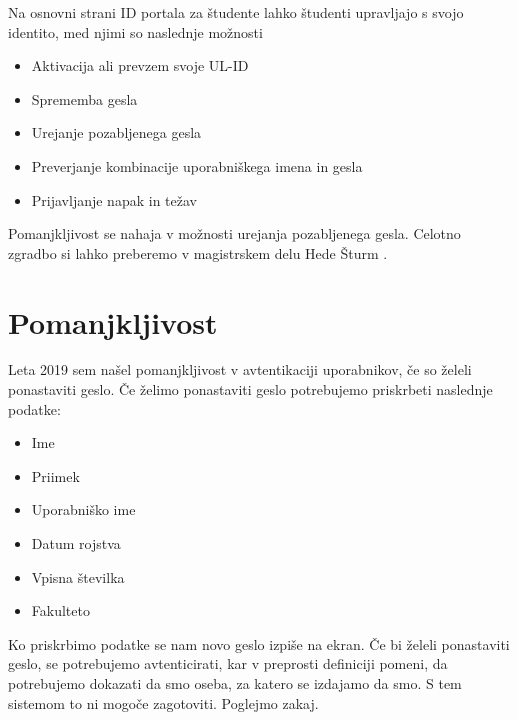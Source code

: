 \documentclass[a4paper,12pt,openright]{book}
\begin{document}
Na osnovni strani ID portala za študente lahko študenti upravljajo s svojo identito, med njimi so naslednje možnosti

\begin{itemize}
    \item Aktivacija ali prevzem svoje UL-ID
    \item Sprememba gesla
    \item Urejanje pozabljenega gesla
    \item Preverjanje kombinacije uporabniškega imena in gesla
    \item Prijavljanje napak in težav
\end{itemize}

Pomanjkljivost se nahaja v možnosti urejanja pozabljenega gesla. Celotno zgradbo si lahko preberemo v magistrskem delu Hede Šturm \cite{magistrska}.

\section{Pomanjkljivost}
Leta 2019 sem našel pomanjkljivost v avtentikaciji uporabnikov, če so želeli ponastaviti geslo. Če želimo ponastaviti geslo potrebujemo priskrbeti naslednje podatke:
\begin{itemize}
    \item Ime
    \item Priimek
    \item Uporabniško ime
    \item Datum rojstva
    \item Vpisna številka
    \item Fakulteto
\end{itemize}

Ko priskrbimo podatke se nam novo geslo izpiše na ekran. Če bi želeli ponastaviti geslo, se potrebujemo avtenticirati, kar v preprosti definiciji pomeni, da potrebujemo dokazati da smo oseba, za katero se izdajamo da smo. S tem sistemom to ni mogoče zagotoviti. Poglejmo zakaj.
\end{document}
